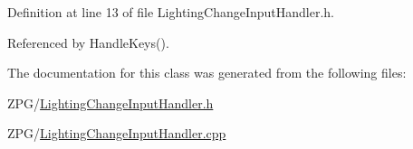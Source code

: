 Definition at line 13 of file Lighting\+Change\+Input\+Handler.\+h.



Referenced by Handle\+Keys().



The documentation for this class was generated from the following files\+:\begin{DoxyCompactItemize}
\item 
Z\+P\+G/\mbox{\hyperlink{LightingChangeInputHandler_8h}{Lighting\+Change\+Input\+Handler.\+h}}\item 
Z\+P\+G/\mbox{\hyperlink{LightingChangeInputHandler_8cpp}{Lighting\+Change\+Input\+Handler.\+cpp}}\end{DoxyCompactItemize}
